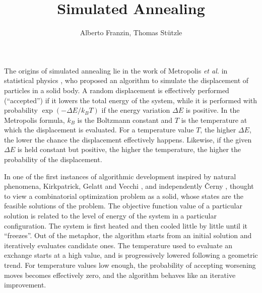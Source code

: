 \title{Simulated Annealing}
\label{chp:simulated-annealing}
\author{Alberto Franzin, Thomas St\"utzle}
\maketitle

\newcommand{\initialtemperature}{\textsc{Initial Temperature}\xspace}
\newcommand{\stoppingcriterion}{\textsc{Stopping Criterion}\xspace}
\newcommand{\explorationcriterion}{\textsc{Neighbourhood Exploration}\xspace}
\newcommand{\acceptancecriterion}{\textsc{Acceptance Criterion}\xspace}
\newcommand{\temperaturelength}{\textsc{Temperature Length}\xspace}
\newcommand{\coolingscheme}{\textsc{Cooling Scheme}\xspace}
\newcommand{\temperaturerestart}{\textsc{Temperature Restart}\xspace}
\newcommand{\initialsolution}{\textsc{Initial Solution}\xspace}
\newcommand{\neighbourhood}{\textsc{Neighbourhood}\xspace}
\newcommand{\brsa}{\texttt{BR1}\xspace}
\newcommand{\qsa}{\texttt{Q8-7}\xspace}

\label{sec:introduction}

The origins of simulated annealing lie in the work of Metropolis 
\textit{et al.} in statistical physics \cite{MetRosRosTel53}, who proposed an algorithm to simulate the displacement of particles in
a solid body. A random displacement is effectively performed (``accepted'')
if it lowers the total energy of the system, while it is performed with 
probability $\exp{(-\Delta E / k_BT)}$ if the energy variation $\Delta E$ is
positive. In the Metropolis formula, $k_B$ is the Boltzmann constant and $T$
is the temperature at which the displacement is evaluated.
For a temperature value $T$, the higher $\Delta E$, the lower the chance
the displacement effectively happens. Likewise, if the given $\Delta E$ is held constant but positive,
the higher the temperature, the higher the probability of the displacement.

In one of the first
instances of algorithmic development inspired by natural phenomena, 
Kirkpatrick, Gelatt and Vecchi \cite{Kirkpatrick83},
and independently \v{C}erny \cite{Cer85}, thought to
view a combinatorial optimization problem as a solid, whose states are the
feasible solutions of the problem. The objective function value of
a particular solution is related to the level of energy of the system in
a particular configuration. The system is first heated
and then cooled little by little until it ``freezes''. 
Out of the metaphor, the algorithm starts from an initial solution
and iteratively evaluates candidate ones.
The temperature used to evaluate an exchange starts at a high value,
and is progressively lowered following a geometric trend. For temperature
values low enough, the probability of accepting worsening moves becomes
effectively zero, and the algorithm behaves like an iterative improvement.


